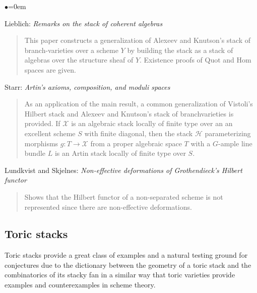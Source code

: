 \begin{list}{$\bullet$}{\leftmargin=0em}
\item Lieblich: \emph{Remarks on the stack of coherent algebras}
\cite{lieblich_remarks}
\begin{quote}
This paper constructs a generalization of Alexeev and Knutson's stack of
branch-varieties over a scheme $Y$ by building the stack as a stack of
algebras over the structure sheaf of $Y$.  Existence proofs of $\text{Quot}$
and $\text{Hom}$ spaces are given.
\end{quote}
\smallskip

\item Starr: \emph{Artin's axioms, composition, and moduli spaces}
\cite{starr_artin}
\begin{quote}
As an application of the main result, a common generalization of Vistoli's
Hilbert stack \cite{vistoli_hilbert} and Alexeev and Knutson's stack of
branchvarieties \cite{alexeev-knutson} is provided.  If $\mathcal{X}$ is
an algebraic stack locally of finite type over an an excellent scheme $S$
with finite diagonal, then the stack $\mathcal{H}$ parameterizing morphisms
$g: T \rightarrow \mathcal{X}$ from a proper algebraic space $T$ with a
$G$-ample line bundle $L$ is an Artin stack locally of finite type over $S$.
\end{quote}
\smallskip

\item Lundkvist and Skjelnes:
\emph{Non-effective deformations of Grothendieck's Hilbert functor}
\cite{lundkvist-skjelnes}
\begin{quote}
Shows that the Hilbert functor of a non-separated scheme is not represented
since there are non-effective deformations.
\end{quote}
\end{list}



\subsection{Toric stacks}
\label{subsection-toric}

\noindent
Toric stacks provide a great class of examples and a natural testing ground
for conjectures due to the dictionary between the geometry of a toric stack
and the combinatorics of its stacky fan in a similar way that toric varieties
provide examples and counterexamples in scheme theory.

